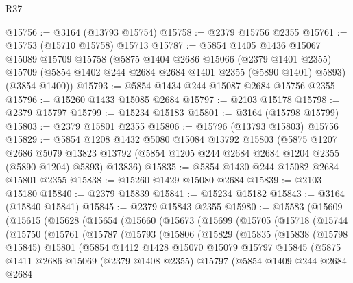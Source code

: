 \begin{lexlean}{R37}
\begin{coremodule}
@15756 := @3164 (@13793 @15754)
@15758 := @2379 @15756 @2355
@15761 := @15753 (@15710 @15758) @15713
@15787 := @5854
    @1405
    @1436
    @15067
    @15089
    @15709
    @15758
    (@5875
      @1404
      @2686
      @15066
      (@2379 @1401 @2355)
      @15709
      (@5854 @1402 @244 @2684 @2684 @1401 @2355 (@5890 @1401) @5893)
      (@3854 @1400))
@15793 := @5854 @1434 @244 @15087 @2684 @15756 @2355
@15796 := @15260 @1433 @15085 @2684
@15797 := @2103 @15178
@15798 := @2379 @15797
@15799 := @15234 @15183
@15801 := @3164 (@15798 @15799)
@15803 := @2379 @15801 @2355
@15806 := @15796 (@13793 @15803) @15756
@15829 := @5854
    @1208
    @1432
    @5080
    @15084
    @13792
    @15803
    (@5875
      @1207
      @2686
      @5079
      @13823
      @13792
      (@5854 @1205 @244 @2684 @2684 @1204 @2355 (@5890 @1204) @5893)
      @13836)
@15835 := @5854 @1430 @244 @15082 @2684 @15801 @2355
@15838 := @15260 @1429 @15080 @2684
@15839 := @2103 @15180
@15840 := @2379 @15839
@15841 := @15234 @15182
@15843 := @3164 (@15840 @15841)
@15845 := @2379 @15843 @2355
@15980 := @15583
    (@15609
      (@15615
        (@15628
          (@15654
            (@15660
              (@15673
                (@15699
                  (@15705
                    (@15718
                      (@15744
                        (@15750
                          (@15761
                            (@15787
                              (@15793
                                (@15806
                                  (@15829
                                    (@15835
                                      (@15838
                                        (@15798 @15845)
                                        @15801
                                        (@5854
                                          @1412
                                          @1428
                                          @15070
                                          @15079
                                          @15797
                                          @15845
                                          (@5875
                                            @1411
                                            @2686
                                            @15069
                                            (@2379 @1408 @2355)
                                            @15797
                                            (@5854
                                              @1409
                                              @244
                                              @2684
                                              @2684

\end{coremodule}
\end{lexlean}
